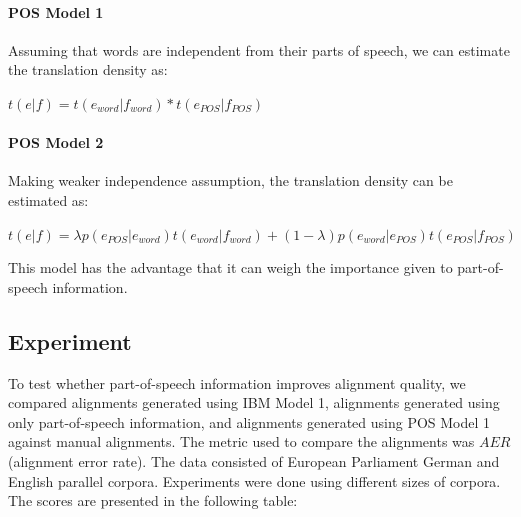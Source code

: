 \documentclass[10pt]{report}
\theoremstyle{plain}
\begin{document}
{\paragraph{POS Model 1}

Assuming that words are independent from their parts of speech, we
can estimate the translation density as:

\begin{center}
$t(e|f) = t(e_{word}|f_{word}) * t(e_{POS}|f_{POS})$
\end{center}



\paragraph{POS Model 2}

Making weaker independence assumption, the translation density can
be estimated as:

\begin{center}

$t(e|f) = \lambda p(e_{POS}|e_{word})t(e_{word}|f_{word}) +
(1-\lambda) p(e_{word}|e_{POS}) t(e_{POS}|f_{POS})$
\end{center}

This model has the advantage that it can weigh the importance given
to part-of-speech information.

\subsection{Experiment}
To test whether part-of-speech information improves alignment
quality, we compared alignments generated using IBM Model 1,
alignments generated using only part-of-speech information, and
alignments generated using POS Model 1 against manual alignments.
The metric used to compare the alignments was $AER$ (alignment error
rate). The data consisted of European Parliament German and English
parallel corpora. Experiments were done using different sizes of
corpora. The scores are presented in the following table:

}
\end{document}
